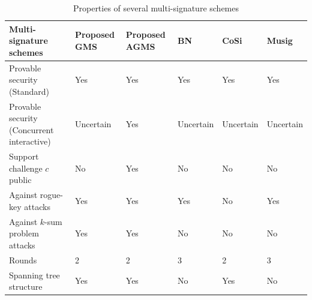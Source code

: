 \documentclass[journal]{IEEEtran}
\begin{document}
\begin{table}[htb]
\caption{Properties of several multi-signature schemes}
\centering
\begin{tabularx}{\linewidth}{p{5cm}XXXXX}
\toprule Multi-signature schemes&Proposed GMS&Proposed AGMS&BN&CoSi&Musig\\
\midrule
Provable security (Standard)&Yes&Yes&Yes&Yes&Yes\\
Provable security (Concurrent interactive)&Uncertain&Yes&Uncertain&Uncertain&Uncertain\\
Support challenge \(c\) public&No&Yes&No&No&No\\
Against rogue-key attacks&Yes&Yes&Yes&No&Yes\\
Against \(k\)-sum problem attacks&Yes&Yes&No&No&No\\
Rounds&2&2&3&2&3\\
Spanning tree structure&Yes&Yes&No&Yes&No\\
\bottomrule
\end{tabularx}
\label{fig11}
\end{table}
\end{document}
